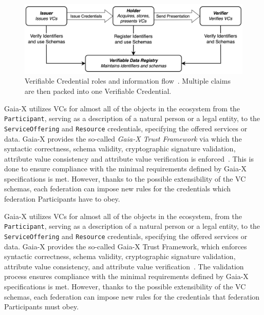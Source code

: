 \begin{figure}
    \centering
    \includegraphics[width=\textwidth]{figures/verifiable-credentials.png}
    \caption{Verifiable Credential roles and information flow~\cite{verifiable_credentials}. Multiple claims are then packed into one Verifiable Credential.}\label{fig:verifiable-credentials}
\end{figure}

Gaia-X utilizes VCs for almost all of the objects in the ecosystem from the \texttt{Participant}, serving as a description of a natural person or a legal entity, to the \texttt{ServiceOffering} and \texttt{Resource} credentials, specifying the offered services or data.
Gaia-X provides the so-called \textit{Gaia-X Trust Framework} via which the syntactic correctness, schema validity, cryptographic signature validation, attribute value consistency and attribute value verification is enforced~\cite{gaiax_architecture_document}.
This is done to ensure compliance with the minimal requirements defined by Gaia-X specifications is met.
However, thanks to the possible extensibility of the VC schemas, each federation can impose new rules for the credentials which federation Participants have to obey.


Gaia-X utilizes VCs for almost all of the objects in the ecosystem, from the \texttt{Participant}, serving as a description of a natural person or a legal entity, to the \texttt{ServiceOffering} and \texttt{Resource} credentials, specifying the offered services or data.
Gaia-X provides the so-called Gaia-X Trust Framework, which enforces syntactic correctness, schema validity, cryptographic signature validation, attribute value consistency, and attribute value verification~\cite{gaiax_architecture_document}.
The validation process ensures compliance with the minimal requirements defined by Gaia-X specifications is met.
However, thanks to the possible extensibility of the VC schemas, each federation can impose new rules for the credentials that federation Participants must obey.

